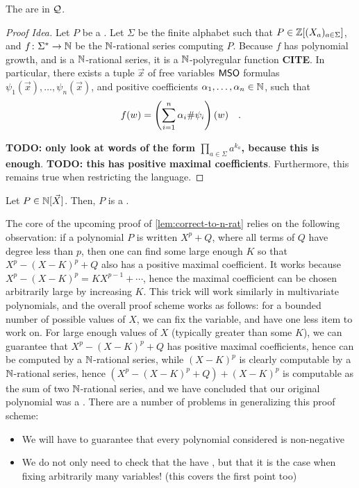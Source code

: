 \documentclass[a4paper,11pt]{article}
\begin{document}
\begin{lemma}
    The  are in $\mathcal{Q}$.
\end{lemma}
\begin{proof}[Proof Idea]
    Let $P$ be a .
    Let $\Sigma$  be the finite alphabet such that
    $P \in \mathbb{Z}[(X_a)_{a \in \Sigma}]$,
    and $f \colon \Sigma^* \to \mathbb{N}$ be the 
    $\mathbb{N}$-rational series computing $P$.
    Because $f$ has polynomial growth, and is a $\mathbb{N}$-rational series,
    it is a $\mathbb{N}$-polyregular function \textbf{CITE}.
    In particular, 
    there exists a tuple $\vec{x}$ of free variables
    $\mathsf{MSO}$ formulas $\psi_1(\vec{x}), \dots, \psi_n(\vec{x})$,
    and positive coefficients $\alpha_1, \dots, \alpha_n \in \mathbb{N}$,
    such that
    \begin{equation*}
        f(w) = \left(\sum_{i = 1}^n \alpha_i {{\#}\psi_i}\right)(w) \quad .
    \end{equation*}

    \textbf{TODO: only look at words of the form $\prod_{a \in \Sigma} a^{k_a}$,
    because this is enough}.
    \textbf{TODO: this has positive maximal coefficients}.
    Furthermore, this remains true when restricting the language.
\end{proof}

\begin{fact}
    \label{fact:n-poly-n-poly}
    Let $P \in \mathbb{N}[\vec{X}]$. Then, $P$
    is a .
\end{fact}


The core of the upcoming proof of \cref{lem:correct-to-n-rat} relies on the
following observation: if a polynomial $P$ is written $X^p + Q$, where all
terms of $Q$ have degree less than $p$, then one can find some large enough $K$
so that $X^p - (X - K)^p + Q$ also has a positive maximal coefficient.
It works because $X^p - (X - K)^p = K X^{p-1} + \cdots$, hence
the maximal coefficient can be chosen arbitrarily large by increasing
$K$.
This
trick will work similarly in multivariate polynomials, and the overall
proof scheme works as follows: for a bounded number of possible
values of $X$, we can fix the variable, and have one less item to work on.
For large enough values of $X$ (typically greater than some $K$), we can guarantee that
$X^p - (X - K)^p + Q$ has positive maximal coefficients, hence
can be computed by a $\mathbb{N}$-rational series, while
$(X - K)^p$ is clearly computable by a $\mathbb{N}$-rational series,
hence $(X^p - (X - K)^p + Q) + (X - K)^p$ is computable
as the sum of two $\mathbb{N}$-rational series, and we have
concluded that our original polynomial was a
. There are a number of problems in generalizing
this proof scheme:
\begin{itemize}
    \item We will have to guarantee that every polynomial considered
        is non-negative
    \item We do not only need to check that the 
        have , but that it is the case
        when fixing arbitrarily many variables! (this
        covers the first point too)
\end{itemize}
\end{document}
